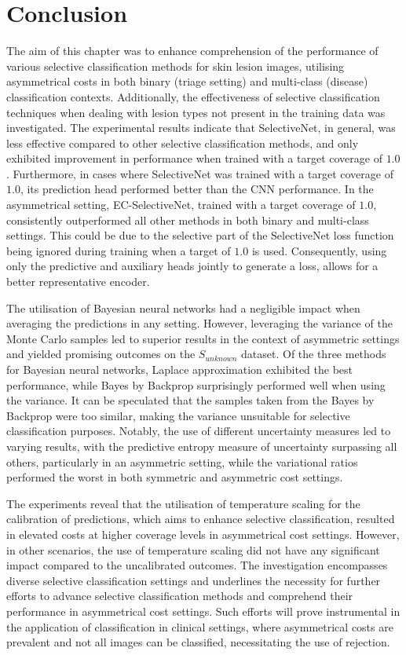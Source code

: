 \section{Conclusion}
\label{sec:selective_conclusion}
The aim of this chapter was to enhance comprehension of the performance of various selective classification methods for skin lesion images, utilising asymmetrical costs in both binary (triage setting) and multi-class (disease) classification contexts. Additionally, the effectiveness of selective classification techniques when dealing with lesion types not present in the training data was investigated. The experimental results indicate that SelectiveNet, in general, was less effective compared to other selective classification methods, and only exhibited improvement in performance when trained with a target coverage of $1.0$. Furthermore, in cases where SelectiveNet was trained with a target coverage of $1.0$, its prediction head performed better than the CNN performance. In the asymmetrical setting, EC-SelectiveNet, trained with a target coverage of $1.0$, consistently outperformed all other methods in both binary and multi-class settings. This could be due to the selective part of the SelectiveNet loss function being ignored during training when a target of $1.0$ is used. Consequently, using only the predictive and auxiliary heads jointly to generate a loss, allows for a better representative encoder.

The utilisation of Bayesian neural networks had a negligible impact when averaging the predictions in any setting. However, leveraging the variance of the Monte Carlo samples led to superior results in the context of asymmetric settings and yielded promising outcomes on the $S_{unknown}$ dataset. Of the three methods for Bayesian neural networks, Laplace approximation exhibited the best performance, while Bayes by Backprop surprisingly performed well when using the variance. It can be speculated that the samples taken from the Bayes by Backprop were too similar, making the variance unsuitable for selective classification purposes. Notably, the use of different uncertainty measures led to varying results, with the predictive entropy measure of uncertainty surpassing all others, particularly in an asymmetric setting, while the variational ratios performed the worst in both symmetric and asymmetric cost settings.

The experiments reveal that the utilisation of temperature scaling for the calibration of predictions, which aims to enhance selective classification, resulted in elevated costs at higher coverage levels in asymmetrical cost settings. However, in other scenarios, the use of temperature scaling did not have any significant impact compared to the uncalibrated outcomes. The investigation encompasses diverse selective classification settings and underlines the necessity for further efforts to advance selective classification methods and comprehend their performance in asymmetrical cost settings. Such efforts will prove instrumental in the application of classification in clinical settings, where asymmetrical costs are prevalent and not all images can be classified, necessitating the use of rejection.